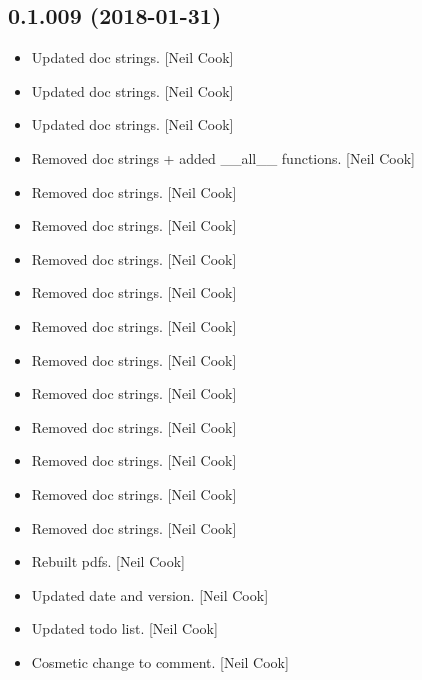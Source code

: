 \documentclass[a4paper,10pt,english]{report}
\begin{document}
\subsection{0.1.009 (2018-01-31)}
\label{\detokenize{misc/changelog:id493}}\begin{itemize}
\item {} 
Updated doc strings. {[}Neil Cook{]}

\item {} 
Updated doc strings. {[}Neil Cook{]}

\item {} 
Updated doc strings. {[}Neil Cook{]}

\item {} 
Removed doc strings + added \_\_all\_\_ functions. {[}Neil Cook{]}

\item {} 
Removed doc strings. {[}Neil Cook{]}

\item {} 
Removed doc strings. {[}Neil Cook{]}

\item {} 
Removed doc strings. {[}Neil Cook{]}

\item {} 
Removed doc strings. {[}Neil Cook{]}

\item {} 
Removed doc strings. {[}Neil Cook{]}

\item {} 
Removed doc strings. {[}Neil Cook{]}

\item {} 
Removed doc strings. {[}Neil Cook{]}

\item {} 
Removed doc strings. {[}Neil Cook{]}

\item {} 
Removed doc strings. {[}Neil Cook{]}

\item {} 
Removed doc strings. {[}Neil Cook{]}

\item {} 
Removed doc strings. {[}Neil Cook{]}

\item {} 
Rebuilt pdfs. {[}Neil Cook{]}

\item {} 
Updated date and version. {[}Neil Cook{]}

\item {} 
Updated todo list. {[}Neil Cook{]}

\item {} 
Cosmetic change to comment. {[}Neil Cook{]}

\end{itemize}
\end{document}
